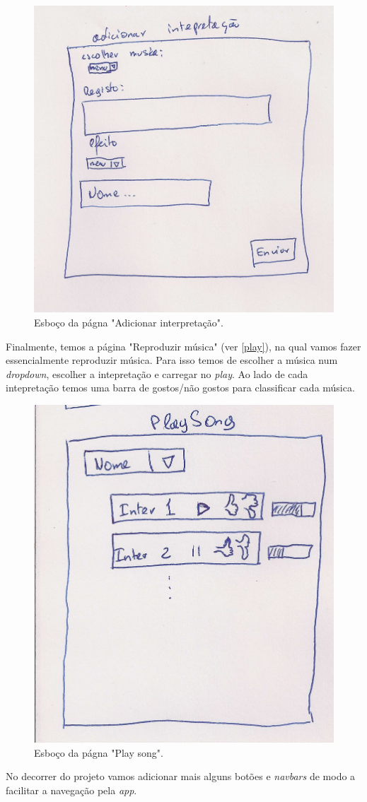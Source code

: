 \begin{figure}[htp]
\centering
\includegraphics[width=\textwidth]{images/adicionarinterpretacao.jpg}
\caption{Esboço da págna "Adicionar interpretação".}
\label{inter}
\end{figure}

Finalmente, temos a página "Reproduzir música" (ver \autoref{play}), na qual vamos fazer essencialmente reproduzir música. Para isso temos de escolher a música num \textit{dropdown}, escolher a intepretação e carregar no \textit{play}. Ao lado de cada intepretação temos uma barra de gostos/não gostos para classificar cada música.

\begin{figure}[htp]
\centering
\includegraphics[width=\textwidth]{images/playsong.jpg}
\caption{Esboço da págna "Play song".}
\label{play}
\end{figure}

No decorrer do projeto vamos adicionar mais alguns botões e \textit{navbars} de modo a facilitar a navegação pela \textit{app}.